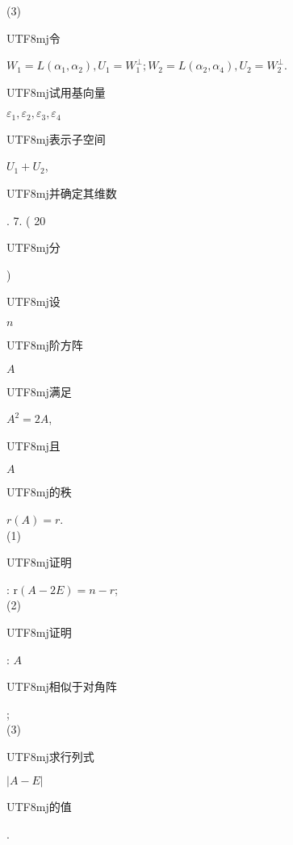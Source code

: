 \documentclass[10pt]{article}
\begin{document}
(3) \begin{CJK}{UTF8}{mj}令\end{CJK} $W_{1}=L\left(\alpha_{1}, \alpha_{2}\right), U_{1}=W_{1}^{\perp} ; W_{2}=L\left(\alpha_{2}, \alpha_{4}\right), U_{2}=W_{2}^{\perp}$. \begin{CJK}{UTF8}{mj}试用基向量\end{CJK} $\varepsilon_{1}, \varepsilon_{2}, \varepsilon_{3}, \varepsilon_{4}$ \begin{CJK}{UTF8}{mj}表示子空间\end{CJK} $U_{1}+U_{2}$, \begin{CJK}{UTF8}{mj}并确定其维数\end{CJK}. 7. ( 20 \begin{CJK}{UTF8}{mj}分\end{CJK}) \begin{CJK}{UTF8}{mj}设\end{CJK} $n$ \begin{CJK}{UTF8}{mj}阶方阵\end{CJK} $A$ \begin{CJK}{UTF8}{mj}满足\end{CJK} $A^{2}=2 A$, \begin{CJK}{UTF8}{mj}且\end{CJK} $A$ \begin{CJK}{UTF8}{mj}的秩\end{CJK} $r(A)=r$.\\
(1) \begin{CJK}{UTF8}{mj}证明\end{CJK}: $\mathrm{r}(A-2 E)=n-r$;\\
(2) \begin{CJK}{UTF8}{mj}证明\end{CJK}: $A$ \begin{CJK}{UTF8}{mj}相似于对角阵\end{CJK};\\
(3) \begin{CJK}{UTF8}{mj}求行列式\end{CJK} $|A-E|$ \begin{CJK}{UTF8}{mj}的值\end{CJK}.
\end{document}
